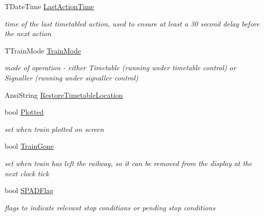 \begin{DoxyCompactItemize}
T\+Date\+Time \mbox{\hyperlink{class_t_train_a1887a95dd5762926ac67d244dd471e45}{Last\+Action\+Time}}
\begin{DoxyCompactList}\small\item\em time of the last timetabled action, used to ensure at least a 30 second delay before the next action \end{DoxyCompactList}\item 
\mbox{\label{class_t_train_a860f87857baefc44a4928311698055a8}} 
T\+Train\+Mode \mbox{\hyperlink{class_t_train_a860f87857baefc44a4928311698055a8}{Train\+Mode}}
\begin{DoxyCompactList}\small\item\em mode of operation -\/ either Timetable (running under timetable control) or Signaller (running under signaller control) \end{DoxyCompactList}\item 
Ansi\+String \mbox{\hyperlink{class_t_train_a2fe228470644e5b9bcc95b3e75f9bf36}{Restore\+Timetable\+Location}}
\item 
\mbox{\label{class_t_train_ae95ef74597b4ef92b9250699e25ef58a}} 
bool \mbox{\hyperlink{class_t_train_ae95ef74597b4ef92b9250699e25ef58a}{Plotted}}
\begin{DoxyCompactList}\small\item\em set when train plotted on screen \end{DoxyCompactList}\item 
\mbox{\label{class_t_train_a3ecf54f0385bc6157ebe5f56512caf1f}} 
bool \mbox{\hyperlink{class_t_train_a3ecf54f0385bc6157ebe5f56512caf1f}{Train\+Gone}}
\begin{DoxyCompactList}\small\item\em set when train has left the railway, so it can be removed from the display at the next clock tick \end{DoxyCompactList}\item 
bool \mbox{\hyperlink{class_t_train_a05383ce005a22df0cb70df7f31a917cf}{S\+P\+A\+D\+Flag}}
\begin{DoxyCompactList}\small\item\em flags to indicate relevant stop conditions or pending stop conditions \end{DoxyCompactList}\item 
\mbox{\label{class_t_train_aa7881a1af2b9f5e899ce02937325c3a3}} 

\end{DoxyCompactItemize}
